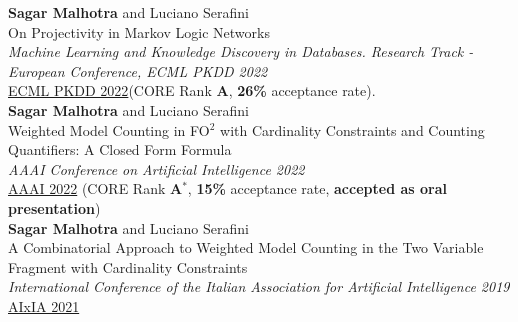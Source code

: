 \documentclass[10pt, a4paper]{article}
\newcommand{\years}[1]{\marginnote{\scriptsize #1}}
\begin{document}


\years{2022}\textbf{Sagar Malhotra} and Luciano Serafini\\
 On Projectivity in Markov Logic Networks \\ \emph{Machine Learning and Knowledge Discovery in Databases. Research Track - European Conference, ECML PKDD 2022} \\  
\href{https://link.springer.com/chapter/10.1007/978-3-031-26419-1_14}{ECML PKDD 2022}(CORE Rank \textbf{A}, \textbf{26\%} acceptance rate).\\ 


\years{2022}\textbf{Sagar Malhotra} and Luciano Serafini\\ 
Weighted Model Counting in FO$^2$ with Cardinality Constraints and Counting Quantifiers: A Closed Form Formula \\ \emph{AAAI Conference on Artificial Intelligence 2022}\\
\href{https://ojs.aaai.org/index.php/AAAI/article/view/20525}{AAAI 2022} (CORE Rank \textbf{A$^{*}$}, \textbf{15\%} acceptance rate, \textbf{accepted as oral presentation}) \\

\years{2021}\textbf{Sagar Malhotra} and Luciano Serafini\\
 A Combinatorial Approach to Weighted Model Counting in the Two Variable Fragment with Cardinality Constraints\\ \emph{International Conference of the Italian Association for Artificial Intelligence 2019}\\
\href{https://link.springer.com/chapter/10.1007/978-3-031-08421-8_10}{AIxIA 2021}

\newpage
\end{document}
